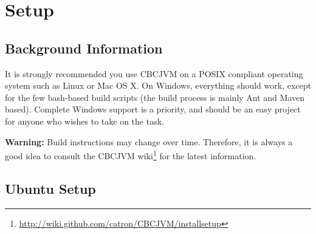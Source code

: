 \documentclass[12pt,letterpaper]{article}
\newcommand{\urlfootnote}[1]{\footnote{\url{#1}}}
\begin{document}
\pagebreak
\section{Setup}

\subsection{Background Information}

It is strongly recommended you use CBCJVM on a POSIX compliant operating system such as Linux or Mac OS X. On Windows, everything should work, except for the few bash-based build scripts (the build process is mainly Ant and Maven based). Complete Windows support is a priority, and should be an easy project for anyone who wishes to take on the task.

\textbf{Warning:} Build instructions may change over time. Therefore, it is always a good idea to consult the CBCJVM wiki\urlfootnote{http://wiki.github.com/catron/CBCJVM/installsetup} for the latest information.

\subsection{Ubuntu Setup}
\end{document}
